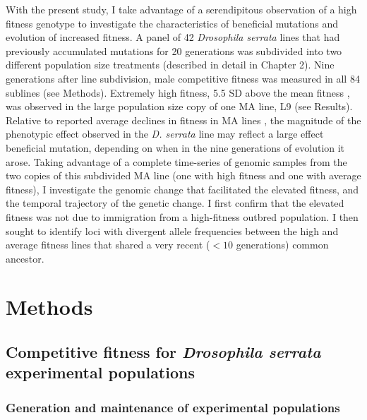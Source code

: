 With the present study, I take advantage of a serendipitous observation of a high fitness genotype to investigate the characteristics of beneficial mutations and evolution of increased fitness. A panel of 42 \textit{Drosophila serrata} lines that had previously accumulated mutations for 20 generations was subdivided into two different population size treatments (described in detail in Chapter 2). Nine generations after line subdivision, male competitive fitness was measured in all 84 sublines (see Methods). Extremely high fitness, 5.5 SD above the mean fitness \citep[corresponding to a 2.01\% change increase in fitness under a unit of selection,][$\sim0.22$\% change per generation if arising immediately after line subdivision]{Hans08}, was observed in the large population size copy of one MA line, L9 (see Results). Relative to reported average declines in fitness in MA lines \citep[0.36\% per generation,][]{Hall09}, the magnitude of the phenotypic effect observed in the \textit{D. serrata} line may reflect a large effect beneficial mutation, depending on when in the nine generations of evolution it arose. Taking advantage of a complete time-series of genomic samples from the two copies of this subdivided MA line (one with high fitness and one with average fitness), I investigate the genomic change that facilitated the elevated fitness, and the temporal trajectory of the genetic change. I first confirm that the elevated fitness was not due to immigration from a high-fitness outbred population. I then sought to identify loci with divergent allele frequencies between the high and average fitness lines that shared a very recent ($<10$ generations) common ancestor.\par


\section{Methods}
\subsection{Competitive fitness for \textit{Drosophila serrata} experimental populations}
\subsubsection{Generation and maintenance of experimental populations}

